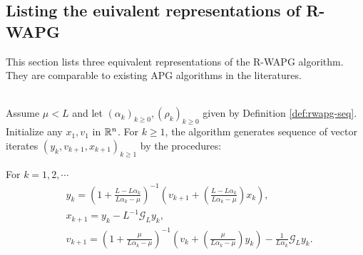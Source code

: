 \documentclass[12pt]{article}
\begin{document}
    \subsection{Listing the euivalent representations of R-WAPG}
        This section lists three equivalent representations of the R-WAPG algorithm. 
        They are comparable to existing APG algorithms in the literatures. 
        \begin{definition}\label{def:r-wapg-intermediate}\;\\
            Assume $\mu < L$ and let $(\alpha_k)_{k \ge 0}, (\rho_k)_{k \ge 0}$ given by Definition \ref{def:rwapg-seq}. 
            Initialize any $x_1, v_1$ in $\mathbb R^n$. 
            For $k \ge 1$, the algorithm generates sequence of vector iterates $(y_{k}, v_{k + 1}, x_{k + 1})_{k \ge 1}$ by the procedures: 
            \begin{tcolorbox}
                For $k = 1, 2, \cdots$
                \begin{align*} 
                    & y_{k} = 
                    \left(
                        1 + \frac{L - L\alpha_{k}}{L\alpha_{k} - \mu}
                    \right)^{-1}
                    \left(
                        v_{k + 1} + 
                        \left(\frac{L - L\alpha_{k}}{L\alpha_{k} - \mu} \right) x_{k}
                    \right), 
                    \\
                    & x_{k + 1} = 
                    y_k - L^{-1} \mathcal G_L y_k, 
                    \\
                    & v_{k + 1} = 
                    \left(
                        1 + \frac{\mu}{L \alpha_k - \mu}
                    \right)^{-1}
                    \left(
                        v_k + 
                        \left(\frac{\mu}{L \alpha_k - \mu}\right) y_k
                    \right) - \frac{1}{L\alpha_{k}}\mathcal G_L y_k. 
                \end{align*}
            \end{tcolorbox}
        \end{definition}
\end{document}
